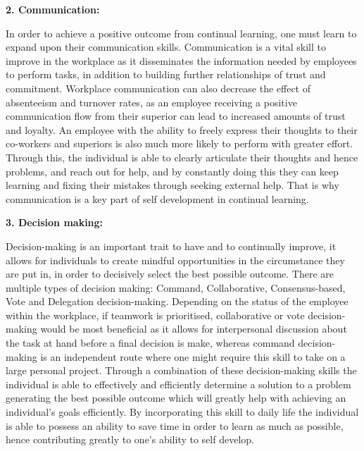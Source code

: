 \documentclass[a4paper, 11pt]{report}
\begin{document}
\bigskip

\textbf{2. Communication:}
\par In order to achieve a positive outcome from continual learning, one must learn to expand upon their communication skills. Communication is a vital skill to improve in the workplace as it disseminates the information needed by employees to perform tasks, in addition to building further relationships of trust and commitment. Workplace communication can also decrease the effect of absenteeism and turnover rates, as an employee receiving a positive communication flow from their superior can lead to increased amounts of trust and loyalty. An employee with the ability to freely express their thoughts to their co-workers and superiors is also much more likely to perform with greater effort. Through this, the individual is able to clearly articulate their thoughts and hence problems, and reach out for help, and by constantly doing this they can keep learning and fixing their mistakes through seeking external help. That is why communication is a key part of self development in continual learning.

\bigskip

\textbf{3. Decision making:}
\par Decision-making is an important trait to have and to continually improve, it allows for individuals to create mindful opportunities in the circumstance they are put in, in order to decisively select the best possible outcome. There are multiple types of decision making: Command, Collaborative, Consensus-based, Vote and Delegation decision-making. Depending on the status of the employee within the workplace, if teamwork is prioritised, collaborative or vote decision-making would be most beneficial as it allows for interpersonal discussion about the task at hand before a final decision is make, whereas command decision-making is an independent route where one might require this skill to take on a large personal project. Through a combination of these decision-making skills the individual is able to effectively and efficiently determine a solution to a problem generating the best possible outcome which will greatly help with achieving an individual's goals efficiently. By incorporating this skill to daily life the individual is able to possess an ability to save time in order to learn as much as possible, hence contributing greatly to one's ability to self develop.

\bigskip
\end{document}

